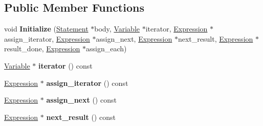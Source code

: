 \subsection*{Public Member Functions}
\begin{DoxyCompactItemize}
\item 
\mbox{\label{classv8_1_1internal_1_1ForOfStatement_aa9d7d46f6b42ac86000906cd5048a672}} 
void {\bfseries Initialize} (\mbox{\hyperlink{classv8_1_1internal_1_1Statement}{Statement}} $\ast$body, \mbox{\hyperlink{classv8_1_1internal_1_1Variable}{Variable}} $\ast$iterator, \mbox{\hyperlink{classv8_1_1internal_1_1Expression}{Expression}} $\ast$assign\+\_\+iterator, \mbox{\hyperlink{classv8_1_1internal_1_1Expression}{Expression}} $\ast$assign\+\_\+next, \mbox{\hyperlink{classv8_1_1internal_1_1Expression}{Expression}} $\ast$next\+\_\+result, \mbox{\hyperlink{classv8_1_1internal_1_1Expression}{Expression}} $\ast$result\+\_\+done, \mbox{\hyperlink{classv8_1_1internal_1_1Expression}{Expression}} $\ast$assign\+\_\+each)
\item 
\mbox{\label{classv8_1_1internal_1_1ForOfStatement_a395162ec1f2368a73aec94df2a7d2767}} 
\mbox{\hyperlink{classv8_1_1internal_1_1Variable}{Variable}} $\ast$ {\bfseries iterator} () const
\item 
\mbox{\label{classv8_1_1internal_1_1ForOfStatement_a163e792dad72712e2042f56c99a0e9e0}} 
\mbox{\hyperlink{classv8_1_1internal_1_1Expression}{Expression}} $\ast$ {\bfseries assign\+\_\+iterator} () const
\item 
\mbox{\label{classv8_1_1internal_1_1ForOfStatement_adfe2549d6612054004c59736e641fa16}} 
\mbox{\hyperlink{classv8_1_1internal_1_1Expression}{Expression}} $\ast$ {\bfseries assign\+\_\+next} () const
\item 
\mbox{\label{classv8_1_1internal_1_1ForOfStatement_aa8079c59154503febbc7dbfa6c57c3bf}} 
\mbox{\hyperlink{classv8_1_1internal_1_1Expression}{Expression}} $\ast$ {\bfseries next\+\_\+result} () const
\item 
\mbox{\label{classv8_1_1internal_1_1ForOfStatement_a13fd382b657fc1361a8893f1c35d088f}} 

\end{DoxyCompactItemize}
